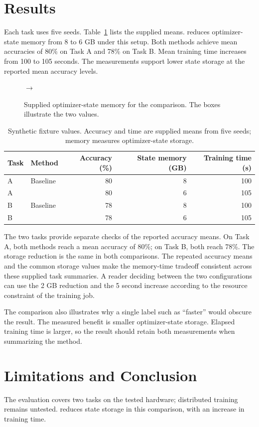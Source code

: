 \section{Results}\label{sec:results}
Each task uses five seeds. Table~\ref{tab:wide} lists the supplied means.
\method{} reduces optimizer-state memory from 8 to 6 GB under this setup.
Both methods achieve mean accuracies of 80\% on Task A and 78\% on Task B.
Mean training time increases from 100 to 105 seconds.
The measurements support lower state storage at the reported mean accuracy levels.

\begin{figure}[h]
\centering
{}
$\longrightarrow$
\caption{Supplied optimizer-state memory for the comparison. The boxes illustrate the two values.}\label{fig:storage}
\end{figure}

\begin{table}[t]
\centering
\caption{Synthetic fixture values. Accuracy and time are supplied means from five seeds; memory measures optimizer-state storage.}\label{tab:wide}
\begin{tabular}{llrrr}
\toprule
Task & Method & Accuracy (\%) & State memory (GB) & Training time (s)\\
\midrule
A & Baseline & 80 & 8 & 100\\
A & \method{} & 80 & 6 & 105\\
B & Baseline & 78 & 8 & 100\\
B & \method{} & 78 & 6 & 105\\
\bottomrule
\end{tabular}
\end{table}


The two tasks provide separate checks of the reported accuracy means.
On Task A, both methods reach a mean accuracy of 80\%; on Task B, both reach 78\%.
The storage reduction is the same in both comparisons.
The repeated accuracy means and the common storage values make the memory-time tradeoff consistent across these supplied task summaries.
A reader deciding between the two configurations can use the 2 GB reduction and the 5 second increase according to the resource constraint of the training job.

The comparison also illustrates why a single label such as ``faster'' would obscure the result.
The measured benefit is smaller optimizer-state storage.
Elapsed training time is larger, so the result should retain both measurements when summarizing the method.

\section{Limitations and Conclusion}
The evaluation covers two tasks on the tested hardware; distributed training remains untested.
\method{} reduces state storage in this comparison, with an increase in training time.
\label{pw:main-end}
